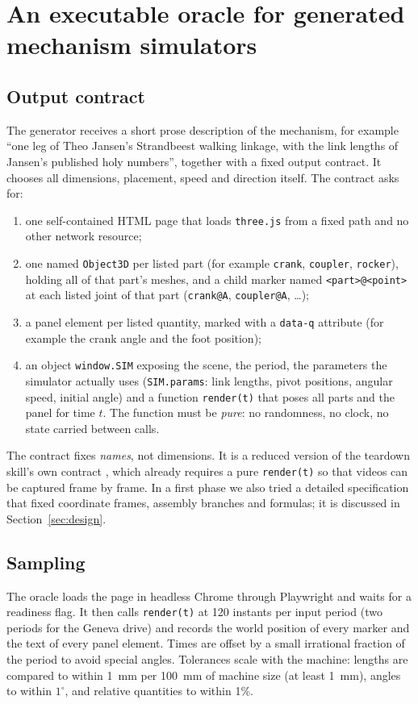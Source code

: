 \section{An executable oracle for generated mechanism simulators}\label{sec:approach}

\subsection{Output contract}
The generator receives a short prose description of the mechanism, for example ``one leg of Theo Jansen's Strandbeest walking linkage, with the link lengths of Jansen's published holy numbers'', together with a fixed output contract. It chooses all dimensions, placement, speed and direction itself. The contract asks for:
\begin{enumerate}
\item one self-contained HTML page that loads \texttt{three.js} from a fixed path and no other network resource;
\item one named \texttt{Object3D} per listed part (for example \texttt{crank}, \texttt{coupler}, \texttt{rocker}), holding all of that part's meshes, and a child marker named \texttt{<part>@<point>} at each listed joint of that part (\texttt{crank@A}, \texttt{coupler@A}, \ldots);
\item a panel element per listed quantity, marked with a \texttt{data-q} attribute (for example the crank angle and the foot position);
\item an object \texttt{window.SIM} exposing the scene, the period, the parameters the simulator actually uses (\texttt{SIM.params}: link lengths, pivot positions, angular speed, initial angle) and a function \texttt{render(t)} that poses all parts and the panel for time $t$. The function must be \emph{pure}: no randomness, no clock, no state carried between calls.
\end{enumerate}
The contract fixes \emph{names}, not dimensions. It is a reduced version of the teardown skill's own contract \cite{teardown}, which already requires a pure \texttt{render(t)} so that videos can be captured frame by frame. In a first phase we also tried a detailed specification that fixed coordinate frames, assembly branches and formulas; it is discussed in Section~\ref{sec:design}.

\subsection{Sampling}
The oracle loads the page in headless Chrome through Playwright and waits for a readiness flag. It then calls \texttt{render(t)} at 120 instants per input period (two periods for the Geneva drive) and records the world position of every marker and the text of every panel element. Times are offset by a small irrational fraction of the period to avoid special angles. Tolerances scale with the machine: lengths are compared to within 1~mm per 100~mm of machine size (at least 1~mm), angles to within $1^\circ$, and relative quantities to within 1\%.

